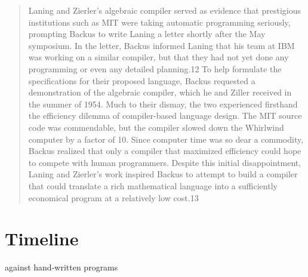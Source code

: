 \begin{quotation}
    Laning and Zierler's algebraic compiler served as evidence that prestigious
    institutions such as MIT were taking automatic programming seriously, prompting
    Backus to write Laning a letter shortly after the May symposium. In the letter,
    Backus informed Laning that his team at IBM was working on a similar compiler,
    but that they had not yet done any programming or even any detailed planning.12
    To help formulate the specifications for their proposed language, Backus
    requested a demonstration of the algebraic compiler, which he and Ziller
    received in the summer of 1954. Much to their dismay, the two experienced firsthand the efficiency dilemma of compiler-based language design. The MIT
    source code was commendable, but the compiler slowed down the Whirlwind
    computer by a factor of 10. Since computer time was so dear a commodity, Backus
    realized that only a compiler that maximized efficiency could hope to compete
    with human programmers. Despite this initial disappointment, Laning and
    Zierler's work inspired Backus to attempt to build a compiler that could
    translate a rich mathematical language into a sufficiently economical program
    at a relatively low cost.13
    \cite{grace_hopper_and_the_invention_of_the_information_age_2009}
\end{quotation}

\pagebreak
\section{Timeline}


against hand-written programs
